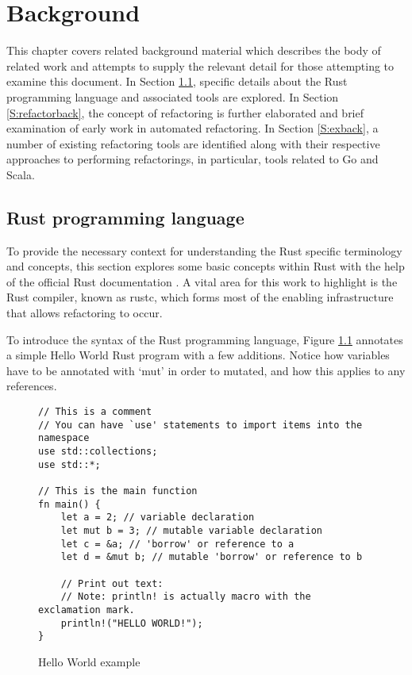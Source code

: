 \chapter{Background}\label{C:back} 
This chapter covers related background material which describes the body of related work and attempts to supply the relevant detail for those attempting to examine this document. In Section \ref{S:rustback}, specific details about the Rust programming language and associated tools are explored. In Section \ref{S:refactorback}, the concept of refactoring is further elaborated and brief examination of early work in automated refactoring. In Section \ref{S:exback}, a number of existing refactoring tools are identified along with their respective approaches to performing refactorings, in particular, tools related to Go and Scala. 

\section{Rust programming language}\label{S:rustback}
To provide the necessary context for understanding the Rust specific terminology and concepts, this section explores some basic concepts within Rust with the help of the official Rust documentation \cite{doc15}. A vital area for this work to highlight is the Rust compiler, known as rustc, which forms most of the enabling infrastructure that allows refactoring to occur. 

To introduce the syntax of the Rust programming language, Figure \ref{Fig:hello} annotates a simple Hello World Rust program with a few additions. Notice how variables have to be annotated with `mut' in order to mutated, and how this applies to any references.

\begin{figure}[H]
\centering
\begin{verbatim}
// This is a comment
// You can have `use' statements to import items into the namespace
use std::collections;
use std::*;

// This is the main function
fn main() {
    let a = 2; // variable declaration
    let mut b = 3; // mutable variable declaration
    let c = &a; // 'borrow' or reference to a
    let d = &mut b; // mutable 'borrow' or reference to b

    // Print out text:
    // Note: println! is actually macro with the exclamation mark.
    println!("HELLO WORLD!");
}
\end{verbatim}
\caption{Hello World example}
\label{Fig:hello}
\end{figure}

